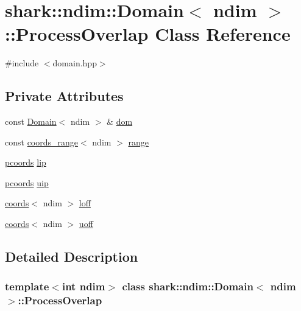 \hypertarget{classshark_1_1ndim_1_1_domain_1_1_process_overlap}{}\section{shark\+:\+:ndim\+:\+:Domain$<$ ndim $>$\+:\+:Process\+Overlap Class Reference}
\label{classshark_1_1ndim_1_1_domain_1_1_process_overlap}


{\ttfamily \#include $<$domain.\+hpp$>$}

\subsection*{Private Attributes}
\begin{DoxyCompactItemize}
\item 
const \hyperlink{classshark_1_1ndim_1_1_domain}{Domain}$<$ ndim $>$ \& \hyperlink{classshark_1_1ndim_1_1_domain_1_1_process_overlap_af73890c5892d8071cdfb29e66ae4e8d8}{dom}
\item 
const \hyperlink{structshark_1_1ndim_1_1coords__range}{coords\+\_\+range}$<$ ndim $>$ \hyperlink{classshark_1_1ndim_1_1_domain_1_1_process_overlap_a1130b73407bf2aaa0a8cb6ac25fcb3c1}{range}
\item 
\hyperlink{classshark_1_1ndim_1_1_domain_a9684ccd8af33cff7639c782290ac37ee}{pcoords} \hyperlink{classshark_1_1ndim_1_1_domain_1_1_process_overlap_ad2db26b8b1a91fd5dea72ffe01a2ac78}{lip}
\item 
\hyperlink{classshark_1_1ndim_1_1_domain_a9684ccd8af33cff7639c782290ac37ee}{pcoords} \hyperlink{classshark_1_1ndim_1_1_domain_1_1_process_overlap_acf20a1ff561cd7b0f50f8f6983cc6283}{uip}
\item 
\hyperlink{structshark_1_1ndim_1_1coords}{coords}$<$ ndim $>$ \hyperlink{classshark_1_1ndim_1_1_domain_1_1_process_overlap_aedfe1a1b3943d517faa3203f201bbc10}{loff}
\item 
\hyperlink{structshark_1_1ndim_1_1coords}{coords}$<$ ndim $>$ \hyperlink{classshark_1_1ndim_1_1_domain_1_1_process_overlap_a9c5f411b46b6a0c7ffab30b43898371e}{uoff}
\end{DoxyCompactItemize}


\subsection{Detailed Description}
\subsubsection*{template$<$int ndim$>$\newline
class shark\+::ndim\+::\+Domain$<$ ndim $>$\+::\+Process\+Overlap}



